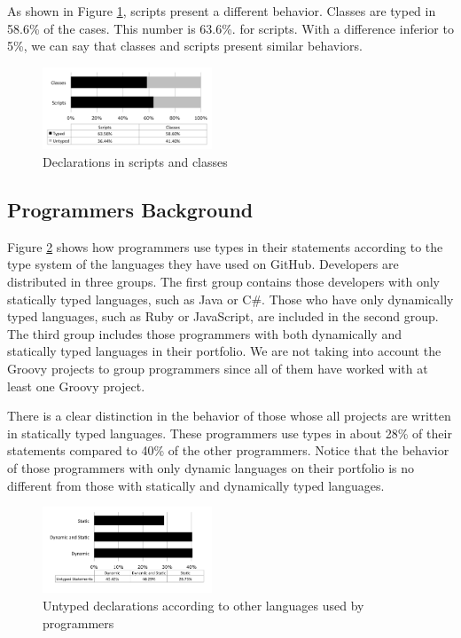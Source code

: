 \documentclass[preprint]{sigplanconf}
\begin{document}
As shown in Figure \ref{fig:scripts}, scripts present a different behavior.
Classes are typed in 58.6\% of the cases. This number is 63.6\%. for scripts.
With a difference inferior to 5\%, we can say that classes and scripts present similar behaviors.

\begin{figure}[ht]
\centering \includegraphics[width=0.45\textwidth]{scripts} 
\caption{Declarations in scripts and classes}
\label{fig:scripts} 
\end{figure}


\subsection{Programmers Background\label{res-background}}

Figure \ref{fig:untyped_background} shows how programmers use types in their statements according to the type system of the languages they have used on GitHub.
Developers are distributed in three groups.
The first group contains those developers with only statically typed languages, such as Java or C\#.
Those who have only dynamically typed languages, such as Ruby or JavaScript, are included in the second group.
The third group includes those programmers with both dynamically and statically typed languages in their portfolio.
We are not taking into account the Groovy projects to group programmers since all of them have worked with at least one Groovy project.

There is a clear distinction in the behavior of those whose all projects are written in statically typed languages.
These programmers use types in about 28\% of their statements compared to 40\% of the other programmers.
Notice that the behavior of those programmers with only dynamic languages on their portfolio is no different from those with statically and dynamically typed languages.

\begin{figure}[ht]
\centering \includegraphics[width=0.45\textwidth]{untyped_background} 
\caption{Untyped declarations according to other languages used by programmers}
\label{fig:untyped_background} 
\end{figure}
\end{document}

